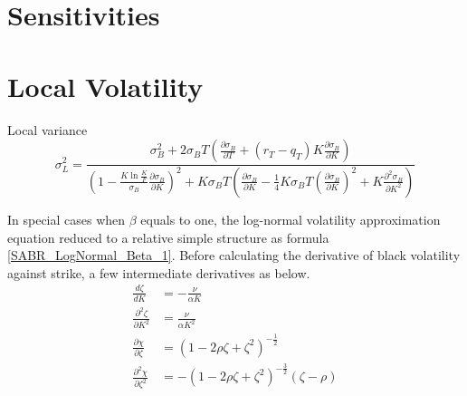 \documentclass{article}
\begin{document}
\section{Sensitivities}



\section{Local Volatility}

Local variance
\begin{equation}
    \sigma_{L}^2 = \frac{\sigma_{B}^2 + 2 \sigma_{B} T \left(\frac{\partial \sigma_{B}}{\partial T} + (r_T - q_T) K \frac{\partial \sigma_{B}}{\partial K}\right)}{\left(1 - \frac{K \ln{\frac{K}{F}}}{\sigma_{B}} \frac{\partial \sigma_{B}}{\partial K}\right)^2 + K \sigma_{B} T \left(\frac{\partial \sigma_{B}}{\partial K} - \frac{1}{4} K \sigma_{B} T \left(\frac{\partial \sigma_{B}}{\partial K}\right)^2 + K \frac{\partial^2 \sigma_{B}}{\partial K^2}\right)}
\end{equation}

In special cases when $ \beta $ equals to one, the log-normal volatility approximation equation reduced to a relative simple structure as formula \ref{SABR_LogNormal_Beta_1}.
Before calculating the derivative of black volatility against strike, a few intermediate derivatives as below.
\begin{subequations}
    \begin{align}
        \frac{d \zeta}{d K} &= -\frac{\nu}{\alpha K} \\
        \frac{\partial^2 \zeta}{\partial K^2} &= \frac{\nu}{\alpha K^2}\\
        \frac{\partial \chi}{\partial \zeta} &= \left(1 - 2 \rho \zeta + \zeta^2\right)^{-\frac{1}{2}}\\
        \frac{\partial^2 \chi}{\partial \zeta^2} &= -\left(1 - 2 \rho \zeta + \zeta^2\right)^{-\frac{3}{2}} \left(\zeta - \rho\right)
    \end{align}
\end{subequations}
\end{document}
